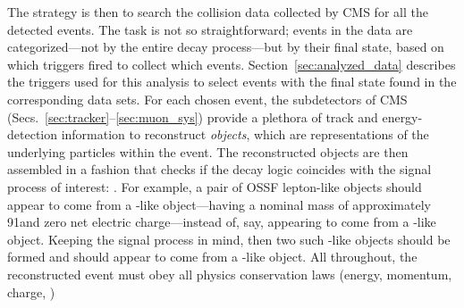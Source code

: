 The strategy is then to search the \pp collision data collected by CMS for all the detected \hzzfourl events.
The task is not so straightforward;
events in the data are categorized---not by the entire decay process---but by their final state, based on which triggers fired to collect which events.
Section~\ref{sec:analyzed_data} describes the triggers used for this analysis to select events with the \fourl final state found in the corresponding data sets.
For each chosen event, the subdetectors of CMS (Secs.~\ref{sec:tracker}--\ref{sec:muon_sys}) provide a plethora of track and energy-detection information to reconstruct \emph{objects}, which are representations of the underlying particles within the event.
The reconstructed objects are then assembled in a fashion that checks if the decay logic coincides with the signal process of interest: \hzzfourl.
For example, a pair of OSSF lepton-like objects should appear to come from a \PZ-like object---\ie having a nominal mass of approximately 91\GeV and zero net electric charge---instead of, say, appearing to come from a \PH-like object.
Keeping the signal process in mind, then two such \PZ-like objects should be formed and should appear to come from a \PH-like object.
All throughout, the reconstructed event must obey all physics conservation laws (energy, momentum, charge, \etc)

